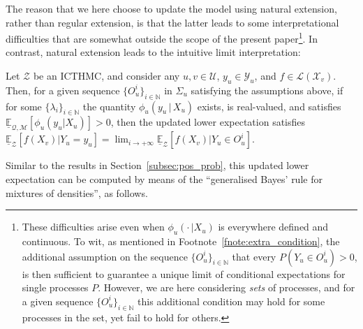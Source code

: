 \documentclass[twoside,11pt]{article}
\newcommand{\nats}{\mathbb{N}}
\newcommand{\states}{\mathcal{X}}
\newcommand{\observs}{\mathcal{Y}}
\newcommand{\lexp}{\underline{\mathbb{E}}_{\rateset,\mathcal{M}}}
\newcommand{\gambles}{\mathcal{L}}
\newcommand{\rateset}{\mathcal{Q}}
\begin{document}
The reason that we here choose to update the model using natural extension, rather than regular extension, is that the latter leads to some interpretational difficulties that are somewhat outside the scope of the present paper\footnote{These difficulties arise even when $\phi_u(\cdot\,\vert X_u)$ is everywhere defined and continuous. To wit, as mentioned in Footnote~\ref{fnote:extra_condition}, the additional assumption on the sequence $\{O_u^i\}_{i\in\nats}$ that every $P(Y_u\in O_u^i)>0$, is then sufficient to guarantee a unique limit of conditional expectations for single processes $P$. However, we are here considering \emph{sets} of processes, and for a given sequence $\{O_u^i\}_{i\in\nats}$ this additional condition may hold for some processes in the set, yet fail to hold for others.}. In contrast, natural extension leads to the intuitive limit interpretation:
\begin{proposition}\label{prop:GBR_for_densities_is_limit_if_continuous}
Let $\mathcal{Z}$ be an ICTHMC, and consider any $u,v\in\mathcal{U}$, $y_u\in\observs_u$, and $f\in\gambles(\states_v)$. Then, for a given sequence $\{O_u^i\}_{i\in\nats}$ in $\Sigma_u$ satisfying the assumptions above, if for some $\{\lambda_i\}_{i\in\nats}$ the quantity $\phi_u(y_u\,\vert\,X_u)$ exists, is real-valued, and satisfies $\lexp[\phi_u(y_u\vert X_u)]>0$, then the updated lower expectation satisfies $\underline{\mathbb{E}}_\mathcal{Z}[f(X_v)\vert Y_u=y_u] 
 = \lim_{i\to+\infty}\underline{\mathbb{E}}_\mathcal{Z}[f(X_v)\vert Y_u\in O_u^i]$.
\end{proposition}

Similar to the results in Section~\ref{subsec:pos_prob}, this updated lower expectation can be computed by means of the ``generalised Bayes' rule for mixtures of densities'', as follows.
\end{document}

